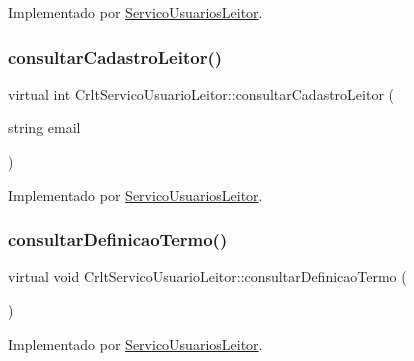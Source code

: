 Implementado por \mbox{\hyperlink{class_servico_usuarios_leitor_ad77426aecdda591b99ecbf8259a05b2d}{Servico\+Usuarios\+Leitor}}.

\mbox{\label{class_crlt_servico_usuario_leitor_a4585305b98f21fe233b2c798edb47496}} 
\subsubsection{\texorpdfstring{consultar\+Cadastro\+Leitor()}{consultarCadastroLeitor()}}
{\footnotesize\ttfamily virtual int Crlt\+Servico\+Usuario\+Leitor\+::consultar\+Cadastro\+Leitor (\begin{DoxyParamCaption}\item[{string}]{email }\end{DoxyParamCaption})\hspace{0.3cm}{\ttfamily [pure virtual]}}



Implementado por \mbox{\hyperlink{class_servico_usuarios_leitor_a8f34dddc0540f729a701d69f948ffb42}{Servico\+Usuarios\+Leitor}}.

\mbox{\label{class_crlt_servico_usuario_leitor_aefac628815c948981d03e2ad00033b47}} 
\subsubsection{\texorpdfstring{consultar\+Definicao\+Termo()}{consultarDefinicaoTermo()}}
{\footnotesize\ttfamily virtual void Crlt\+Servico\+Usuario\+Leitor\+::consultar\+Definicao\+Termo (\begin{DoxyParamCaption}{ }\end{DoxyParamCaption})\hspace{0.3cm}{\ttfamily [pure virtual]}}



Implementado por \mbox{\hyperlink{class_servico_usuarios_leitor_a89ed39e45ee1c564e1f62df7154d1b29}{Servico\+Usuarios\+Leitor}}.

